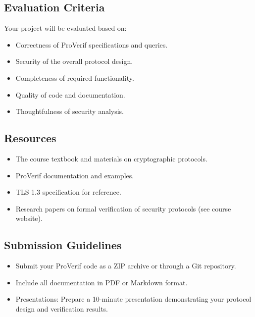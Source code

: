 \documentclass[10pt,a4paper,american]{article}
\begin{document}
\subsection*{Evaluation Criteria}
Your project will be evaluated based on:

\begin{itemize}
	\item Correctness of ProVerif specifications and queries.
	\item Security of the overall protocol design.
	\item Completeness of required functionality.
	\item Quality of code and documentation.
	\item Thoughtfulness of security analysis.
\end{itemize}

\subsection*{Resources}
\begin{itemize}
	\item The course textbook and materials on cryptographic protocols.
	\item ProVerif documentation and examples.
	\item TLS 1.3 specification for reference.
	\item Research papers on formal verification of security protocols (see course website).
\end{itemize}

\subsection*{Submission Guidelines}
\begin{itemize}
	\item Submit your ProVerif code as a ZIP archive or through a Git repository.
	\item Include all documentation in PDF or Markdown format.
	\item Presentations: Prepare a 10-minute presentation demonstrating your protocol design and verification results.
\end{itemize}
\end{document}
